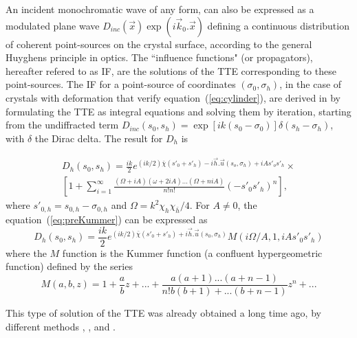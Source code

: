 \documentclass[preprint]{iucr}              %
\newcommand{\inblue}[1]{{\color{blue}#1}}
\newcommand{\inred}[1]{{\color{red}#1}}
\begin{document}
An incident monochromatic wave of any form, can also be expressed as a modulated plane wave $D_{inc}(\vec x)\exp(i\vec k_0. \vec x)$ defining a continuous distribution of coherent point-sources on the crystal surface, according to the general Huyghens principle in optics. The ``influence functions" (or propagators), hereafter refered to as IF, are the solutions of the TTE corresponding to these point-sources. The IF for a point-source of coordinates $(\sigma_0,\sigma_h)$, in the case of crystals with deformation that verify equation~(\ref{eq:cylinder}), are derived in \cite{GuigayFerrero2016} by formulating the TTE as integral equations and solving them by iteration, starting from the undiffracted term $D_{inc}(s_0,s_h)=\exp[ik(s_0-\sigma_0)]\delta(s_h-\sigma_h)$, \inblue{with $\delta$ the Dirac delta.} The result for $D_h$ is \cite{GuigayFerrero2016}

\begin{multline}
\label{eq:preKummer}
    D_h(s_0,s_h) = \frac{i k}{2} e^{(ik/2) \bar \chi (s'_0 + s'_h) - i\vec h.\vec u(s_o,\sigma_h)+i A s'_o s'_h } \times
    \\
    [1 + \sum_{i=1}^\infty \frac{(\Omega + i A )(\omega+2iA)...(\Omega+niA)}{n!n!}(-s'_0s'_h)^n],
\end{multline}
where $s'_{0,h}=s_{0,h}-\sigma_{0,h}$ and $\Omega = k^2 \chi_h \chi_{\bar h}/4$. For $A\ne0$, the equation~(\ref{eq:preKummer}) can be expressed as
\begin{equation}
\label{eq:kummer}
    D_h(s_0,s_h) = \frac{i k }{2} e^{(ik/2) \bar \chi (s'_0 + s'_h) + i \vec h . \vec u (s_0,\sigma_h)} M(i\Omega/A,1,iA s'_0 s'_h)
\end{equation}
where the $M$ function is the Kummer function (a confluent hypergeometric function) defined by the series
\begin{equation}
\label{eq:kummerSeries}
    M(a,b,z) = 1 + \frac{a}{b} z + 
    ... + \frac{a(a+1)...(a+n-1)}{n! b (b+1)+...(b+n-1)}z^n+...
\end{equation}

This type of solution of the TTE was already obtained a long time ago, by different methods \cite{Petrashen1974}, \cite{Katagawa1974}, \cite{Litzmann1974} and \cite{Chukhovski1977}.
\end{document}
